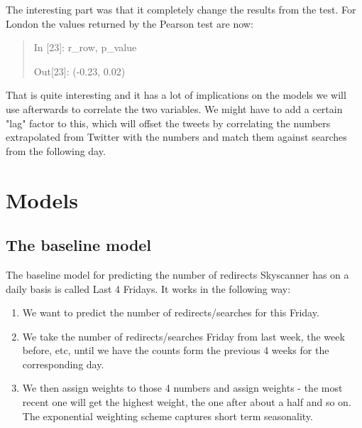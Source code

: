 \documentclass[minf,frontabs,twoside,singlespacing,parskip]{infthesis}
\begin{document}
The interesting part was that it completely change the results from the test. For London the values returned by the Pearson test are now:

\begin{quotation}
In [23]: r\_row, p\_value

Out[23]: (-0.23, 0.02)
\end{quotation}

That is quite interesting and it has a lot of implications on the models we will use afterwards to correlate the two variables. 
We might have to add a certain "lag" factor to this, which will offset the tweets by correlating the numbers extrapolated from Twitter with the numbers and match them against searches from the following day.




\chapter{Models}
\label{chap:model}

\section{The baseline model}
\label{sec:baseline}

The baseline model for predicting the number of redirects Skyscanner has on a daily basis is called Last 4 Fridays. 
It works in the following way:
\begin{enumerate}
\item We want to predict the number of redirects/searches for this Friday.
\item We take the number of redirects/searches Friday from last week, the week before, etc, until we have the counts form the previous 4 weeks for the corresponding day.
\item We then assign weights to those 4 numbers and assign weights - the most recent one will get the highest weight, the one after about a half and so on. The exponential weighting scheme captures short term seasonality.
\end{enumerate}
\end{document}
